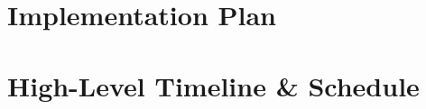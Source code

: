 \documentclass[a4paper]{article}
\begin{document}
\section{Implementation Plan} %

\section{High-Level Timeline \& Schedule} %
\end{document}
